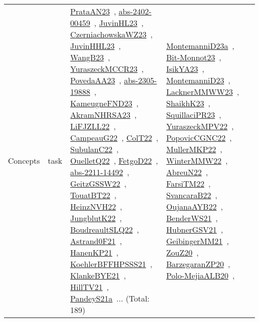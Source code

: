 {\begin{longtable}{lp{3cm}>{\raggedright\arraybackslash}p{6cm}>{\raggedright\arraybackslash}p{6cm}>{\raggedright\arraybackslash}p{8cm}}
Concepts & task & \href{works/PrataAN23.pdf}{PrataAN23}~\cite{PrataAN23}, \href{works/abs-2402-00459.pdf}{abs-2402-00459}~\cite{abs-2402-00459}, \href{works/JuvinHL23.pdf}{JuvinHL23}~\cite{JuvinHL23}, \href{works/CzerniachowskaWZ23.pdf}{CzerniachowskaWZ23}~\cite{CzerniachowskaWZ23}, \href{works/JuvinHHL23.pdf}{JuvinHHL23}~\cite{JuvinHHL23}, \href{works/WangB23.pdf}{WangB23}~\cite{WangB23}, \href{works/YuraszeckMCCR23.pdf}{YuraszeckMCCR23}~\cite{YuraszeckMCCR23}, \href{works/PovedaAA23.pdf}{PovedaAA23}~\cite{PovedaAA23}, \href{works/abs-2305-19888.pdf}{abs-2305-19888}~\cite{abs-2305-19888}, \href{works/KameugneFND23.pdf}{KameugneFND23}~\cite{KameugneFND23}, \href{works/AkramNHRSA23.pdf}{AkramNHRSA23}~\cite{AkramNHRSA23}, \href{works/LiFJZLL22.pdf}{LiFJZLL22}~\cite{LiFJZLL22}, \href{works/CampeauG22.pdf}{CampeauG22}~\cite{CampeauG22}, \href{works/ColT22.pdf}{ColT22}~\cite{ColT22}, \href{works/SubulanC22.pdf}{SubulanC22}~\cite{SubulanC22}, \href{works/OuelletQ22.pdf}{OuelletQ22}~\cite{OuelletQ22}, \href{works/FetgoD22.pdf}{FetgoD22}~\cite{FetgoD22}, \href{works/abs-2211-14492.pdf}{abs-2211-14492}~\cite{abs-2211-14492}, \href{works/GeitzGSSW22.pdf}{GeitzGSSW22}~\cite{GeitzGSSW22}, \href{works/TouatBT22.pdf}{TouatBT22}~\cite{TouatBT22}, \href{works/HeinzNVH22.pdf}{HeinzNVH22}~\cite{HeinzNVH22}, \href{works/JungblutK22.pdf}{JungblutK22}~\cite{JungblutK22}, \href{works/BoudreaultSLQ22.pdf}{BoudreaultSLQ22}~\cite{BoudreaultSLQ22}, \href{works/Astrand0F21.pdf}{Astrand0F21}~\cite{Astrand0F21}, \href{works/HanenKP21.pdf}{HanenKP21}~\cite{HanenKP21}, \href{works/KoehlerBFFHPSSS21.pdf}{KoehlerBFFHPSSS21}~\cite{KoehlerBFFHPSSS21}, \href{works/KlankeBYE21.pdf}{KlankeBYE21}~\cite{KlankeBYE21}, \href{works/HillTV21.pdf}{HillTV21}~\cite{HillTV21}, \href{works/PandeyS21a.pdf}{PandeyS21a}~\cite{PandeyS21a}... (Total: 189) & \href{works/MontemanniD23a.pdf}{MontemanniD23a}~\cite{MontemanniD23a}, \href{works/Bit-Monnot23.pdf}{Bit-Monnot23}~\cite{Bit-Monnot23}, \href{works/IsikYA23.pdf}{IsikYA23}~\cite{IsikYA23}, \href{works/MontemanniD23.pdf}{MontemanniD23}~\cite{MontemanniD23}, \href{works/LacknerMMWW23.pdf}{LacknerMMWW23}~\cite{LacknerMMWW23}, \href{works/ShaikhK23.pdf}{ShaikhK23}~\cite{ShaikhK23}, \href{works/SquillaciPR23.pdf}{SquillaciPR23}~\cite{SquillaciPR23}, \href{works/YuraszeckMPV22.pdf}{YuraszeckMPV22}~\cite{YuraszeckMPV22}, \href{works/PopovicCGNC22.pdf}{PopovicCGNC22}~\cite{PopovicCGNC22}, \href{works/MullerMKP22.pdf}{MullerMKP22}~\cite{MullerMKP22}, \href{works/WinterMMW22.pdf}{WinterMMW22}~\cite{WinterMMW22}, \href{works/AbreuN22.pdf}{AbreuN22}~\cite{AbreuN22}, \href{works/FarsiTM22.pdf}{FarsiTM22}~\cite{FarsiTM22}, \href{works/SvancaraB22.pdf}{SvancaraB22}~\cite{SvancaraB22}, \href{works/OujanaAYB22.pdf}{OujanaAYB22}~\cite{OujanaAYB22}, \href{works/BenderWS21.pdf}{BenderWS21}~\cite{BenderWS21}, \href{works/HubnerGSV21.pdf}{HubnerGSV21}~\cite{HubnerGSV21}, \href{works/GeibingerMM21.pdf}{GeibingerMM21}~\cite{GeibingerMM21}, \href{works/ZouZ20.pdf}{ZouZ20}~\cite{ZouZ20}, \href{works/BarzegaranZP20.pdf}{BarzegaranZP20}~\cite{BarzegaranZP20}, \href{works/Polo-MejiaALB20.pdf}{Polo-MejiaALB20}~\cite{Polo-MejiaALB20}, 
\end{longtable}}
